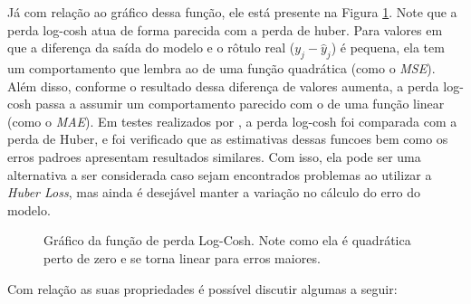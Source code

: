 Já com relação ao gráfico dessa função, ele está presente na Figura \ref{fig:log-cosh-loss}. Note que a perda log-cosh atua de forma parecida com a perda de huber. Para valores em que a diferença da saída do modelo e o rôtulo real ($y_j - \hat{y}_j$) é pequena, ela tem um comportamento que lembra ao de uma função quadrática (como o \textit{MSE}). Além disso, conforme o resultado dessa diferença de valores aumenta, a perda log-cosh passa a assumir um comportamento parecido com o de uma função linear (como o \textit{MAE}). Em testes realizados por \textcite{StatisticalPropetiesLogCosh}, a perda log-cosh foi comparada com a perda de Huber, e foi verificado que as estimativas dessas funcoes bem como os erros padroes apresentam resultados similares. Com isso, ela pode ser uma alternativa a ser considerada caso sejam encontrados problemas ao utilizar a \textit{Huber Loss}, mas ainda é desejável manter a variação no cálculo do erro do modelo.

\begin{figure}[h!]
    \centering
    \caption{Gráfico da função de perda Log-Cosh. Note como ela é quadrática perto de zero e se torna linear para erros maiores.}
    \label{fig:log-cosh-loss}
\end{figure}

Com relação as suas propriedades é possível discutir algumas a seguir:

